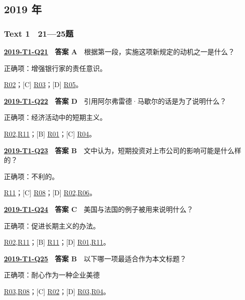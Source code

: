 \documentclass[11pt,a4paper]{article}
\begin{document}
\subsection{2019 年}\label{year-2019}
\subsubsection{Text 1　21—25题}
\label{idx-2019-T1-Q21}
\noindent\textbf{\href{https://zj139.github.io/math-notes/english/1977a3ff9804ae89e29c2489/\#q21}{2019-T1-Q21}　答案 A}　根据第一段，实施这项新规定的动机之一是什么？\par\nopagebreak
\noindent 正确项：增强银行家的责任意识。\par\nopagebreak
\noindent [B] \hyperref[cat-R02]{R02}；[C] \hyperref[cat-R03]{R03}；[D] \hyperref[cat-R05]{R05}。
\par\smallskip
{}\label{idx-2019-T1-Q22}
\noindent\textbf{\href{https://zj139.github.io/math-notes/english/1977a3ff9804ae89e29c2489/\#q22}{2019-T1-Q22}　答案 D}　引用阿尔弗雷德·马歇尔的话是为了说明什么？\par\nopagebreak
\noindent 正确项：经济活动中的短期主义。\par\nopagebreak
\noindent [A] \hyperref[cat-R02]{R02},\hyperref[cat-R11]{R11}；[B] \hyperref[cat-R01]{R01}；[C] \hyperref[cat-R04]{R04}。
\par\smallskip
{}\label{idx-2019-T1-Q23}
\noindent\textbf{\href{https://zj139.github.io/math-notes/english/1977a3ff9804ae89e29c2489/\#q23}{2019-T1-Q23}　答案 B}　文中认为，短期投资对上市公司的影响可能是什么样的？\par\nopagebreak
\noindent 正确项：不利的。\par\nopagebreak
\noindent [A] \hyperref[cat-R11]{R11}；[C] \hyperref[cat-R08]{R08}；[D] \hyperref[cat-R02]{R02},\hyperref[cat-R06]{R06}。
\par\smallskip
{}\label{idx-2019-T1-Q24}
\noindent\textbf{\href{https://zj139.github.io/math-notes/english/1977a3ff9804ae89e29c2489/\#q24}{2019-T1-Q24}　答案 C}　美国与法国的例子被用来说明什么？\par\nopagebreak
\noindent 正确项：促进长期主义的办法。\par\nopagebreak
\noindent [A] \hyperref[cat-R02]{R02},\hyperref[cat-R11]{R11}；[B] \hyperref[cat-R11]{R11}；[D] \hyperref[cat-R01]{R01},\hyperref[cat-R11]{R11}。
\par\smallskip
{}\label{idx-2019-T1-Q25}
\noindent\textbf{\href{https://zj139.github.io/math-notes/english/1977a3ff9804ae89e29c2489/\#q25}{2019-T1-Q25}　答案 B}　以下哪一项最适合作为本文标题？\par\nopagebreak
\noindent 正确项：耐心作为一种企业美德\par\nopagebreak
\noindent [A] \hyperref[cat-R03]{R03},\hyperref[cat-R08]{R08}；[C] \hyperref[cat-R02]{R02}；[D] \hyperref[cat-R03]{R03},\hyperref[cat-R04]{R04}。
\par\smallskip
\end{document}
